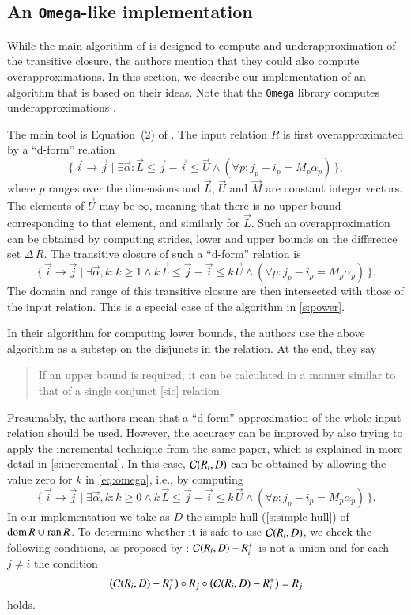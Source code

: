 \subsection{An {\tt Omega}-like implementation}

While the main algorithm of  is
designed to compute and underapproximation of the transitive closure,
the authors mention that they could also compute overapproximations.
In this section, we describe our implementation of an algorithm
that is based on their ideas.
Note that the {\tt Omega} library computes underapproximations
.

The main tool is Equation~(2) of .
The input relation $R$ is first overapproximated by a ``d-form'' relation
$$
\{\, \vec i \to \vec j \mid \exists \vec \alpha :
\vec L \le \vec j - \vec i \le \vec U
\wedge
(\forall p : j_p - i_p = M_p \alpha_p)
\,\}
,
$$
where $p$ ranges over the dimensions and $\vec L$, $\vec U$ and
$\vec M$ are constant integer vectors.  The elements of $\vec U$
may be $\infty$, meaning that there is no upper bound corresponding
to that element, and similarly for $\vec L$.
Such an overapproximation can be obtained by computing strides,
lower and upper bounds on the difference set $\Delta \, R$.
The transitive closure of such a ``d-form'' relation is
\begin{equation}
\label{eq:omega}
\{\, \vec i \to \vec j \mid \exists \vec \alpha, k :
k \ge 1 \wedge
k \, \vec L \le \vec j - \vec i \le k \, \vec U
\wedge
(\forall p : j_p - i_p = M_p \alpha_p)
\,\}
.
\end{equation}
The domain and range of this transitive closure are then
intersected with those of the input relation.
This is a special case of the algorithm in \autoref{s:power}.

In their algorithm for computing lower bounds, the authors
use the above algorithm as a substep on the disjuncts in the relation.
At the end, they say
\begin{quote}
If an upper bound is required, it can be calculated in a manner
similar to that of a single conjunct [sic] relation.
\end{quote}
Presumably, the authors mean that a ``d-form'' approximation
of the whole input relation should be used.
However, the accuracy can be improved by also trying to
apply the incremental technique from the same paper,
which is explained in more detail in \autoref{s:incremental}.
In this case, ${\cal C}(R_i,D)$ can be obtained by
allowing the value zero for $k$ in \eqref{eq:omega},
i.e., by computing
$$
\{\, \vec i \to \vec j \mid \exists \vec \alpha, k :
k \ge 0 \wedge
k \, \vec L \le \vec j - \vec i \le k \, \vec U
\wedge
(\forall p : j_p - i_p = M_p \alpha_p)
\,\}
.
$$
In our implementation we take as $D$ the simple hull
(\autoref{s:simple hull}) of $\mathop{\rm dom}\nolimits R \cup \mathop{\rm ran}\nolimits R$.
To determine whether it is safe to use ${\cal C}(R_i,D)$,
we check the following conditions, as proposed by
:
${\cal C}(R_i,D) - R_i^+$ is not a union and for each $j \ne i$
the condition
$$
\left({\cal C}(R_i,D) - R_i^+\right)
\circ
R_j
\circ
\left({\cal C}(R_i,D) - R_i^+\right)
=
R_j
$$
holds.
